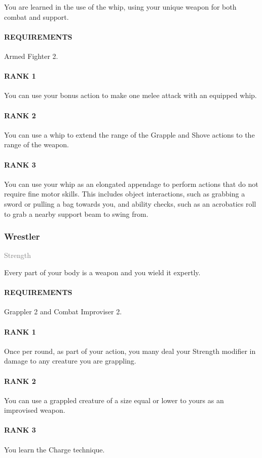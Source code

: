 \normalsize
You are learned in the use of the whip, using your unique weapon for both combat and support.
\paragraph{REQUIREMENTS} Armed Fighter 2.
\paragraph{RANK 1} You can use your bonus action to make one melee attack with an equipped whip.
\paragraph{RANK 2} You can use a whip to extend the range of the Grapple and Shove actions to the range of the weapon.
\paragraph{RANK 3} You can use your whip as an elongated appendage to perform actions that do not require fine motor skills.
This includes object interactions, such as grabbing a sword or pulling a bag towards you, and ability checks, such as an acrobatics roll to grab a nearby support beam to swing from.

\subsubsection{Wrestler} \label{feat::wrestler}
\small{\textcolor{gray}{Strength}}

\normalsize
Every part of your body is a weapon and you wield it expertly.
\paragraph{REQUIREMENTS} Grappler 2 and Combat Improviser 2.
\paragraph{RANK 1} Once per round, as part of your action, you many deal your Strength modifier in damage to any creature you are grappling.
\paragraph{RANK 2} You can use a grappled creature of a size equal or lower to yours as an improvised weapon.
\paragraph{RANK 3} You learn the Charge technique.

